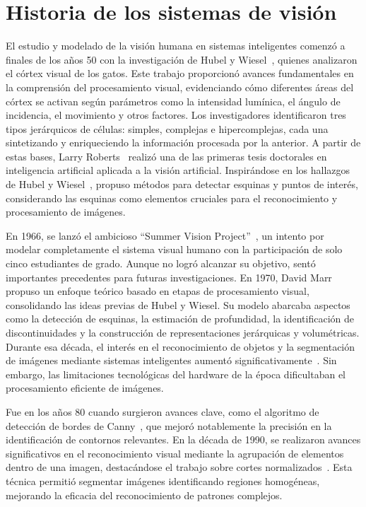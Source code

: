 \documentclass[12pt,letterpaper]{article}
\begin{document}
\hypertarget{Indice}{}
\tableofcontents
\newpage
\section{Historia de los sistemas de visión}
El estudio y modelado de la visión humana en sistemas inteligentes comenzó a finales de los años 50 con la investigación de Hubel y Wiesel~\cite{CatVisualCortex}, 
quienes analizaron el córtex visual de los gatos. Este trabajo proporcionó avances fundamentales en la comprensión del procesamiento visual, 
evidenciando cómo diferentes áreas del córtex se activan según parámetros como la intensidad lumínica, el ángulo de incidencia, el movimiento y otros factores. 
Los investigadores identificaron tres tipos jerárquicos de células: simples, complejas e hipercomplejas, cada una sintetizando y enriqueciendo la información 
procesada por la anterior. A partir de estas bases, Larry Roberts~\cite{LarryRoberts} realizó una de las primeras tesis doctorales en inteligencia artificial aplicada a la visión artificial. 
Inspirándose en los hallazgos de Hubel y Wiesel~\cite{CatVisualCortex}, propuso métodos para detectar esquinas y puntos de interés, considerando las esquinas como elementos 
cruciales para el reconocimiento y procesamiento de imágenes.

En 1966, se lanzó el ambicioso ``Summer Vision Project''~\cite{SummerVisionProject}, un intento por modelar completamente el sistema visual humano con la participación de solo cinco estudiantes de grado. 
Aunque no logró alcanzar su objetivo, sentó importantes precedentes para futuras investigaciones.  En 1970, David Marr~\cite{DavidMar} propuso un enfoque teórico basado en etapas de procesamiento 
visual, consolidando las ideas previas de Hubel y Wiesel. Su modelo abarcaba aspectos como la detección de esquinas, la estimación de profundidad, la identificación de discontinuidades y 
la construcción de representaciones jerárquicas y volumétricas. Durante esa década, el interés en el reconocimiento de objetos y la segmentación de imágenes 
mediante sistemas inteligentes aumentó significativamente~\cite{PictorialStructures}. Sin embargo, las limitaciones tecnológicas del hardware de la época dificultaban el procesamiento eficiente de imágenes.

Fue en los años 80 cuando surgieron avances clave, como el algoritmo de detección de bordes de Canny~\cite{Canny}, 
que mejoró notablemente la precisión en la identificación de contornos relevantes. 
En la década de 1990, se realizaron avances significativos en el reconocimiento visual mediante la agrupación de elementos dentro de una imagen, 
destacándose el trabajo sobre cortes normalizados~\cite{NormalizedCuts}. 
Esta técnica permitió segmentar imágenes identificando regiones homogéneas, mejorando la eficacia del reconocimiento de patrones complejos.
\end{document}
